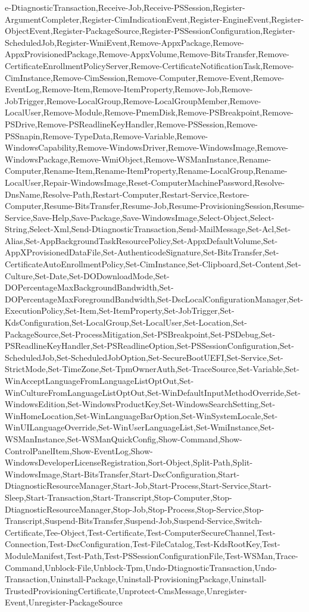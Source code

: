 {e-DtiagnosticTransaction,Receive-Job,Receive-PSSession,Register-ArgumentCompleter,Register-CimIndicationEvent,Register-EngineEvent,Register-ObjectEvent,Register-PackageSource,Register-PSSessionConfiguration,Register-ScheduledJob,Register-WmiEvent,Remove-AppxPackage,Remove-AppxProvisionedPackage,Remove-AppxVolume,Remove-BitsTransfer,Remove-CertificateEnrollmentPolicyServer,Remove-CertificateNotificationTask,Remove-CimInstance,Remove-CimSession,Remove-Computer,Remove-Event,Remove-EventLog,Remove-Item,Remove-ItemProperty,Remove-Job,Remove-JobTrigger,Remove-LocalGroup,Remove-LocalGroupMember,Remove-LocalUser,Remove-Module,Remove-PmemDisk,Remove-PSBreakpoint,Remove-PSDrive,Remove-PSReadlineKeyHandler,Remove-PSSession,Remove-PSSnapin,Remove-TypeData,Remove-Variable,Remove-WindowsCapability,Remove-WindowsDriver,Remove-WindowsImage,Remove-WindowsPackage,Remove-WmiObject,Remove-WSManInstance,Rename-Computer,Rename-Item,Rename-ItemProperty,Rename-LocalGroup,Rename-LocalUser,Repair-WindowsImage,Reset-ComputerMachinePassword,Resolve-DnsName,Resolve-Path,Restart-Computer,Restart-Service,Restore-Computer,Resume-BitsTransfer,Resume-Job,Resume-ProvisioningSession,Resume-Service,Save-Help,Save-Package,Save-WindowsImage,Select-Object,Select-String,Select-Xml,Send-DtiagnosticTransaction,Send-MailMessage,Set-Acl,Set-Alias,Set-AppBackgroundTaskResourcePolicy,Set-AppxDefaultVolume,Set-AppXProvisionedDataFile,Set-AuthenticodeSignature,Set-BitsTransfer,Set-CertificateAutoEnrollmentPolicy,Set-CimInstance,Set-Clipboard,Set-Content,Set-Culture,Set-Date,Set-DODownloadMode,Set-DOPercentageMaxBackgroundBandwidth,Set-DOPercentageMaxForegroundBandwidth,Set-DscLocalConfigurationManager,Set-ExecutionPolicy,Set-Item,Set-ItemProperty,Set-JobTrigger,Set-KdsConfiguration,Set-LocalGroup,Set-LocalUser,Set-Location,Set-PackageSource,Set-ProcessMitigation,Set-PSBreakpoint,Set-PSDebug,Set-PSReadlineKeyHandler,Set-PSReadlineOption,Set-PSSessionConfiguration,Set-ScheduledJob,Set-ScheduledJobOption,Set-SecureBootUEFI,Set-Service,Set-StrictMode,Set-TimeZone,Set-TpmOwnerAuth,Set-TraceSource,Set-Variable,Set-WinAcceptLanguageFromLanguageListOptOut,Set-WinCultureFromLanguageListOptOut,Set-WinDefaultInputMethodOverride,Set-WindowsEdition,Set-WindowsProductKey,Set-WindowsSearchSetting,Set-WinHomeLocation,Set-WinLanguageBarOption,Set-WinSystemLocale,Set-WinUILanguageOverride,Set-WinUserLanguageList,Set-WmiInstance,Set-WSManInstance,Set-WSManQuickConfig,Show-Command,Show-ControlPanelItem,Show-EventLog,Show-WindowsDeveloperLicenseRegistration,Sort-Object,Split-Path,Split-WindowsImage,Start-BitsTransfer,Start-DscConfiguration,Start-DtiagnosticResourceManager,Start-Job,Start-Process,Start-Service,Start-Sleep,Start-Transaction,Start-Transcript,Stop-Computer,Stop-DtiagnosticResourceManager,Stop-Job,Stop-Process,Stop-Service,Stop-Transcript,Suspend-BitsTransfer,Suspend-Job,Suspend-Service,Switch-Certificate,Tee-Object,Test-Certificate,Test-ComputerSecureChannel,Test-Connection,Test-DscConfiguration,Test-FileCatalog,Test-KdsRootKey,Test-ModuleManifest,Test-Path,Test-PSSessionConfigurationFile,Test-WSMan,Trace-Command,Unblock-File,Unblock-Tpm,Undo-DtiagnosticTransaction,Undo-Transaction,Uninstall-Package,Uninstall-ProvisioningPackage,Uninstall-TrustedProvisioningCertificate,Unprotect-CmsMessage,Unregister-Event,Unregister-PackageSource}

